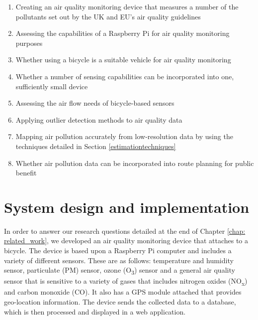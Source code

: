 \documentclass[11pt]{report}
\begin{document}
\begin{enumerate}
\item Creating an air quality monitoring device that measures a number of the pollutants set out by the UK and EU's air quality guidelines
\item Assessing the capabilities of a Raspberry Pi for air quality monitoring purposes
\item Whether using a bicycle is a suitable vehicle for air quality monitoring
\item Whether a number of sensing capabilities can be incorporated into one, sufficiently small device
\item Assessing the air flow needs of bicycle-based sensors
\item Applying outlier detection methods to air quality data %
\item Mapping air pollution accurately from low-resolution data by using the techniques detailed in Section \ref{estimationtechniques}
\item Whether air pollution data can be incorporated into route planning for public benefit
\end{enumerate}



\chapter{System design and implementation} \label{chap: system_design}

In order to answer our research questions detailed at the end of Chapter \ref{chap: related_work}, we developed an air quality monitoring device that attaches to a bicycle. The device is based upon a Raspberry Pi computer and includes a variety of different sensors. These are as follows: temperature and humidity sensor, particulate (PM) sensor, ozone (O\textsubscript{3}) sensor and a general air quality sensor that is sensitive to a variety of gases that includes nitrogen oxides (NO\textsubscript{x}) and carbon monoxide (CO). It also has a GPS module attached that provides geo-location information. The device sends the collected data to a database, which is then processed and displayed in a web application. 
\end{document}
